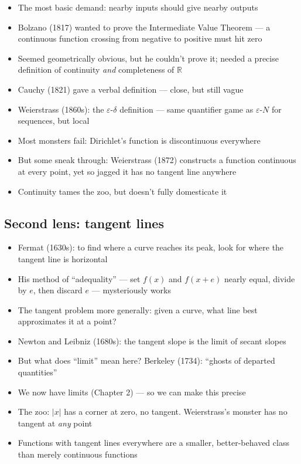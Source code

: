 \documentclass[
  10pt,
  letterpaper,
]{scrbook}
\providecommand{\tightlist}{%
  \setlength{\itemsep}{0pt}\setlength{\parskip}{0pt}}
\newcommand{\RR}{\mathbb{R}}
\begin{document}
\begin{itemize}
\tightlist
\item
  The most basic demand: nearby inputs should give nearby outputs
\item
  Bolzano (1817) wanted to prove the Intermediate Value Theorem --- a
  continuous function crossing from negative to positive must hit zero
\item
  Seemed geometrically obvious, but he couldn't prove it; needed a
  precise definition of continuity \emph{and} completeness of \(\RR\)
\item
  Cauchy (1821) gave a verbal definition --- close, but still vague
\item
  Weierstrass (1860s): the \(\varepsilon\)-\(\delta\) definition ---
  same quantifier game as \(\varepsilon\)-\(N\) for sequences, but local
\item
  Most monsters fail: Dirichlet's function is discontinuous everywhere
\item
  But some sneak through: Weierstrass (1872) constructs a function
  continuous at every point, yet so jagged it has no tangent line
  anywhere
\item
  Continuity tames the zoo, but doesn't fully domesticate it
\end{itemize}

\subsection*{Second lens: tangent
lines}\label{second-lens-tangent-lines}

\begin{itemize}
\tightlist
\item
  Fermat (1630s): to find where a curve reaches its peak, look for where
  the tangent line is horizontal
\item
  His method of ``adequality'' --- set \(f(x)\) and \(f(x+e)\) nearly
  equal, divide by \(e\), then discard \(e\) --- mysteriously works
\item
  The tangent problem more generally: given a curve, what line best
  approximates it at a point?
\item
  Newton and Leibniz (1680s): the tangent slope is the limit of secant
  slopes
\item
  But what does ``limit'' mean here? Berkeley (1734): ``ghosts of
  departed quantities''
\item
  We now have limits (Chapter 2) --- so we can make this precise
\item
  The zoo: \(|x|\) has a corner at zero, no tangent. Weierstrass's
  monster has no tangent at \emph{any} point
\item
  Functions with tangent lines everywhere are a smaller, better-behaved
  class than merely continuous functions
\end{itemize}
\end{document}
